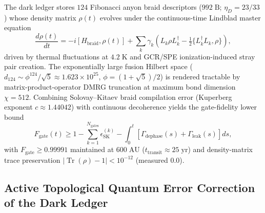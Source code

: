 \documentclass[10pt,twocolumn]{IEEEtran}
\begin{document}
The dark ledger stores $124$ Fibonacci anyon braid descriptors
($992\;\mathrm{B}$; $\eta_D=23/33$) whose density matrix $\rho(t)$
evolves under the continuous-time Lindblad master equation
\begin{equation}
\frac{d\rho(t)}{dt}=-i\left[H_{\mathrm{braid}},\rho(t)\right]
+\sum_k\gamma_k\left(L_k\rho L_k^{\dagger}
-\tfrac{1}{2}\{L_k^{\dagger}L_k,\rho\}\right),
\label{eq:lindblad}
\end{equation}
driven by thermal fluctuations at $4.2\;\mathrm{K}$ and GCR/SPE
ionization-induced stray pair creation. The exponentially large fusion
Hilbert space
($d_{124}\sim\phi^{124}/\sqrt{5}\approx1.623\times10^{25}$,
$\phi=(1+\sqrt{5})/2$) is rendered tractable by matrix-product-operator
DMRG truncation at maximum bond dimension $\chi=512$. Combining
Solovay--Kitaev braid compilation error (Kuperberg exponent
$c\approx1.44042$) with continuous decoherence yields the gate-fidelity
lower bound
\begin{equation}
F_{\mathrm{gate}}(t)\geq1-\sum_{k=1}^{N_{\mathrm{gates}}}
\epsilon_{\mathrm{SK}}^{(k)}
-\int_0^{t}\left[\Gamma_{\mathrm{dephase}}(s)
+\Gamma_{\mathrm{leak}}(s)\right]ds,
\label{eq:fidelity_bound}
\end{equation}
with $F_{\mathrm{gate}}\geq0.99991$ maintained at $600\;\mathrm{AU}$
($t_{\mathrm{transit}}\approx25\;\mathrm{yr}$) and density-matrix trace
preservation $|\operatorname{Tr}(\rho)-1|<10^{-12}$ (measured $0.0$).

\subsection{Active Topological Quantum Error Correction of the Dark Ledger}
\label{sec:tqec}
\end{document}
